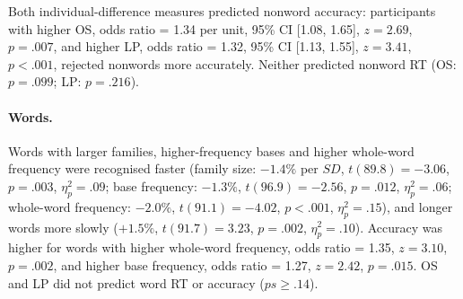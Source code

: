 Both individual-difference measures predicted nonword accuracy: participants with
higher OS, odds ratio = 1.34 per unit, 95\% CI [1.08, 1.65], $z = 2.69$,
$p = .007$, and higher LP, odds ratio = 1.32, 95\% CI [1.13, 1.55], $z = 3.41$,
$p < .001$, rejected nonwords more accurately. Neither predicted nonword RT
(OS: $p = .099$; LP: $p = .216$).

\paragraph{Words.}
Words with larger families, higher-frequency bases and higher whole-word
frequency were recognised faster (family size: $-1.4\%$ per $SD$, $t(89.8) =
-3.06$, $p = .003$, $\eta^2_p = .09$; base frequency: $-1.3\%$, $t(96.9) = -2.56$,
$p = .012$, $\eta^2_p = .06$; whole-word frequency: $-2.0\%$, $t(91.1) = -4.02$,
$p < .001$, $\eta^2_p = .15$), and longer words more slowly ($+1.5\%$,
$t(91.7) = 3.23$, $p = .002$, $\eta^2_p = .10$). Accuracy was higher for words
with higher whole-word frequency, odds ratio = 1.35, $z = 3.10$, $p = .002$, and
higher base frequency, odds ratio = 1.27, $z = 2.42$, $p = .015$. OS and LP did
not predict word RT or accuracy ($ps \geq .14$).

